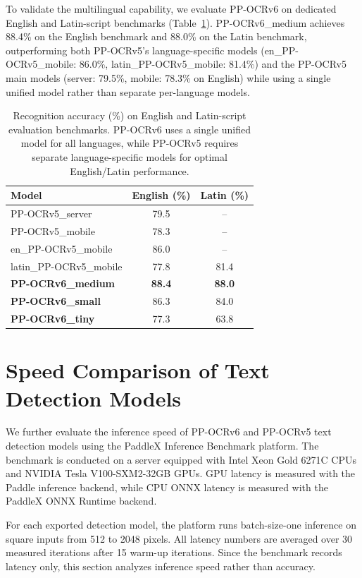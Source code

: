\documentclass[11pt, a4paper,logo,  copyright, nonumbering]{paddleocr}
\begin{document}
To validate the multilingual capability, we evaluate PP-OCRv6 on dedicated English and Latin-script benchmarks (Table~\ref{tab:latin_eval}). PP-OCRv6\_medium achieves 88.4\% on the English benchmark and 88.0\% on the Latin benchmark, outperforming both PP-OCRv5's language-specific models (en\_PP-OCRv5\_mobile: 86.0\%, latin\_PP-OCRv5\_mobile: 81.4\%) and the PP-OCRv5 main models (server: 79.5\%, mobile: 78.3\% on English) while using a single unified model rather than separate per-language models.

\begin{table}[h]
\centering
\small
\begin{tabular}{lcc}
\toprule
\textbf{Model} & \textbf{English (\%)} & \textbf{Latin (\%)} \\
\midrule
PP-OCRv5\_server & 79.5 & -- \\
PP-OCRv5\_mobile & 78.3 & -- \\
en\_PP-OCRv5\_mobile & 86.0 & -- \\
latin\_PP-OCRv5\_mobile & 77.8 & 81.4 \\
\midrule
\textbf{PP-OCRv6\_medium} & \textbf{88.4} & \textbf{88.0} \\
\textbf{PP-OCRv6\_small} & 86.3 & 84.0 \\
\textbf{PP-OCRv6\_tiny} & 77.3 & 63.8 \\
\bottomrule
\end{tabular}
\caption{Recognition accuracy (\%) on English and Latin-script evaluation benchmarks. PP-OCRv6 uses a single unified model for all languages, while PP-OCRv5 requires separate language-specific models for optimal English/Latin performance.}
\label{tab:latin_eval}
\end{table}


\newpage
\section{Speed Comparison of Text Detection Models}
\label{sec:det_speed}

We further evaluate the inference speed of PP-OCRv6 and PP-OCRv5 text detection models using the PaddleX Inference Benchmark platform. The benchmark is conducted on a server equipped with Intel Xeon Gold 6271C CPUs and NVIDIA Tesla V100-SXM2-32GB GPUs. GPU latency is measured with the Paddle inference backend, while CPU ONNX latency is measured with the PaddleX ONNX Runtime backend.

For each exported detection model, the platform runs batch-size-one inference on square inputs from 512 to 2048 pixels. All latency numbers are averaged over 30 measured iterations after 15 warm-up iterations. Since the benchmark records latency only, this section analyzes inference speed rather than accuracy.
\end{document}
